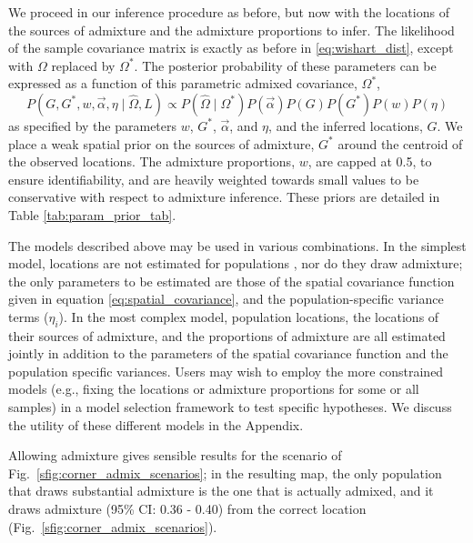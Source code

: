 \documentclass[10pt,letterpaper]{article}
\newcommand{\identifyadmixsource}[1]{{#1^{*}}}
\begin{document}
We proceed in our inference procedure as before, but now with the locations of the sources of admixture and the admixture proportions to infer.
The likelihood of the sample covariance matrix is exactly as before in \eqref{eq:wishart_dist},
except with $\Omega$ replaced by $\identifyadmixsource{\Omega}$.
The posterior probability of these parameters can be expressed as a function of this parametric admixed covariance, $\identifyadmixsource{\Omega}$,
\begin{equation}
\label{eq:admixed_post_prob}
P(G,\identifyadmixsource{G}, w,\vec{\alpha}, \eta \mid \widehat{\Omega}, L) 
	\propto  
		P(\widehat{\Omega}  \mid \identifyadmixsource{\Omega}) P(\vec{\alpha}) P(G) P(\identifyadmixsource{G}) P(w) P(\eta) 
\end{equation}
as specified by the parameters $w$, $\identifyadmixsource{G}$, $\vec{\alpha}$, and $\eta$, and the inferred locations, $G$.  
We place a weak spatial prior on the sources of admixture, $\identifyadmixsource{G}$ around the centroid of the observed locations. The admixture proportions, $w$, are capped at 0.5, to ensure identifiability,
and are heavily weighted towards small values to be conservative with respect to admixture inference.  
These priors are detailed in Table \ref{tab:param_prior_tab}.

The models described above may be used in various combinations.  In the simplest model, locations are not estimated for populations , nor do they draw admixture; the only parameters to be estimated are those of the spatial covariance function given in equation \eqref{eq:spatial_covariance}, and the population-specific variance terms ($\eta_i$).  In the most complex model, population locations, the locations of their sources of admixture, and the proportions of admixture are all estimated jointly in addition to the parameters of the spatial covariance function and the population specific variances.  Users may wish to employ the more constrained models (e.g., fixing the locations or admixture proportions for some or all samples) in a model selection framework to test specific hypotheses.  We discuss the utility of these different models in the Appendix.

Allowing admixture gives sensible results for the scenario of Fig.\ \ref{sfig:corner_admix_scenarios};
in the resulting map,
the only population that draws substantial admixture is the one that is actually admixed, 
and it draws admixture (95\% CI: 0.36 - 0.40) from the correct location (Fig.\ \ref{sfig:corner_admix_scenarios}).
\end{document}
